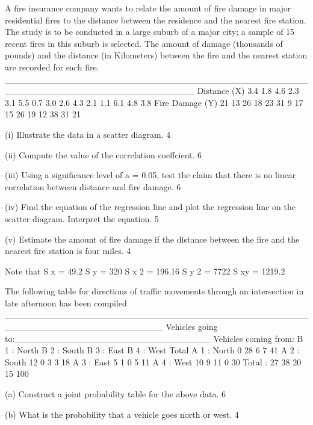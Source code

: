 A fire insurance company wants to relate the amount of fire damage in major residential fires to the distance between the residence and the nearest fire station. The study is to be conducted in a large suburb of a major city; a sample of 15 recent fires in this suburb is selected. The amount of damage (thousands of pounds) and the distance (in Kilometers) between the fire and the nearest station are recorded for each fire. 
______________________________________________________________________________
Distance (X) 	 3.4   1.8    4.6    2.3    3.1    5.5    0.7    3.0    2.6    4.3    2.1    1.1    6.1    4.8   3.8 
Fire Damage (Y)   21    13     26     18     23     31     9       17     15     26     19     12     38     31    21    
 
(i)   Illustrate the data in a scatter diagram. 					4 
 
(ii)  Compute the value of the correlation coeffcient. 				6 
 
(iii) Using a significance level of a = 0.05, test the claim that there is no linear      correlation  between distance and fire damage. 				 6 
 
(iv)  Find the equation of the regression line and plot the regression line on the scatter  diagram. Interpret the equation. 					5 
 
(v)  Estimate the amount of fire damage if the distance between the fire and the  nearest  fire station is four miles. 						4 
 
Note that 
S x = 49.2 
S y = 320 
S x 2 = 196.16 
S y 2 = 7722 
S xy = 1219.2 
 
	
The following table for directions of traffic movements through an intersection in late afternoon has been compiled 
_________________________________________________________________________
Vehicles going to:_______________________________
Vehicles coming from:	B 1 : North 	B 2 : South    B 3 : East     B 4 : West      Total 
A 1 : North 			0 		28 	       6 		   7 	  41 
A 2 : South 			12 		0 	       3 		   3 	  18 
A 3 : East 			 	5 		1 	        0 		   5           11 
A 4 : West 			10 		9 	       11              	    0          30         
Total : 				27 		38 	       20                    15        100 
 	
(a) Construct a joint probability table for the above data. 			6 
 
(b) What is the probability that a vehicle goes north or west. 			4 
 
